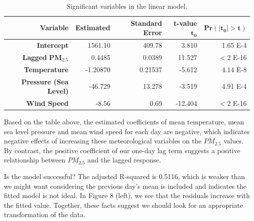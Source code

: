 \documentclass[11pt]{article} %
\begin{document}
 \begin{table}
 \begin{tabular} {| r | r | r | r | r |}
 \hline
 \textbf{Variable} & 
\textbf{Estimated} & 
\textbf{Standard Error} & 
\textbf{t-value} \(\mathbf{t_0}\) & 
\(\mathbf{Pr(\vert t_0 \vert >t)}\) \\ \hline
\textbf{Intercept} & 1561.10 & 409.78 & 3.810 & 1.65 E-4 \\ \hline
\textbf{Lagged }\(\mathbf{PM_{2.5}}\) & 0.4485 & 0.0389 & 11.527 & \(<\)2 E-16 \\ \hline
\textbf{Temperature} & -1.20870 & 0.21537 & -5.612 & 4.14 E-8 \\ \hline
\textbf{Pressure (Sea Level)} & -46.729 & 13.278 & -3.519 & 4.91 E-4 \\ \hline
\textbf{Wind Speed} & -8.56 & 0.69 & -12.404 & \(<\)2 E-16 \\ \hline
 \end{tabular}
 \caption{Significant variables in the linear model.}
 \end{table}
 
Based on the table above, the estimated coefficients of 
mean temperature, mean sea level pressure and mean wind speed for each day are negative, 
which indicates negative effects of increasing these
meteorological variables on the \(PM_{2.5}\) values. 
By contrast, the positive coefficient of our one-day lag term suggests a positive relationship between
\(PM_{2.5}\) and the lagged response.

Is the model successful? The adjusted R-squared is 0.5116, which is weaker than we might want considering the previous day's mean is included and indicates the fitted model is not ideal. 
In Figure 8 (left), we see that the residuals increase with the fitted value. Together, these facts suggest we should look for an appropriate transformation of the data.
\end{document}
